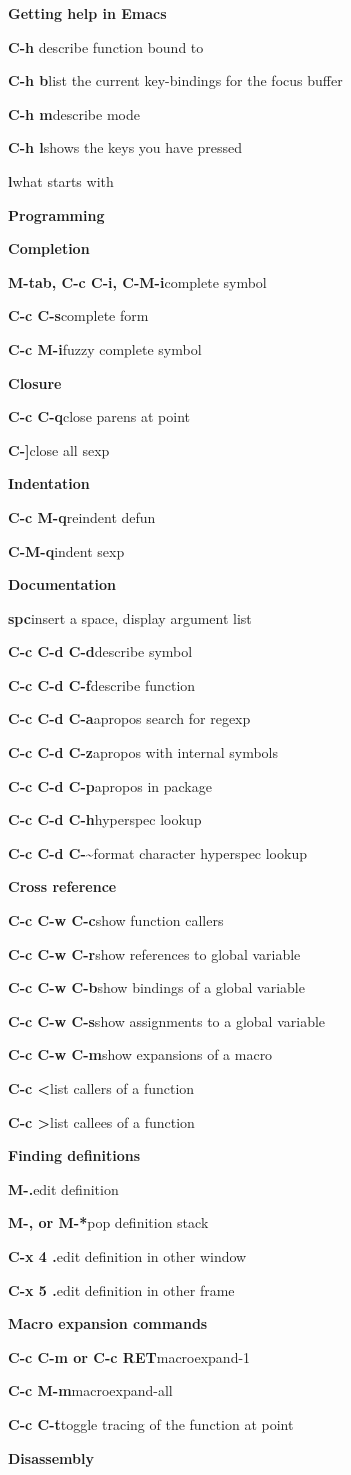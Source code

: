 \documentclass[a4paper,10pt]{article}
\newcommand{\group}[1]{\bigskip\par\noindent\textbf{\large#1}\medskip}
\newcommand{\subgroup}[1]{\medskip\par\noindent\textbf{#1}\smallskip}
\newcommand{\key}[2]{\par\noindent\textbf{#1}\hfill{#2}}
\newcommand{\meta}[1]{\textlangle{#1}\textrangle}
\begin{document}

\group{Getting help in Emacs}

\key{C-h \meta{key}}{describe function bound to \meta{key}}
\key{C-h b}{list the current key-bindings for the focus buffer}
\key{C-h m}{describe mode}
\key{C-h l}{shows the keys you have pressed}
\key{\meta{key} l}{what starts with \meta{key}}

\group{Programming}

\subgroup{Completion}

\key{M-tab, C-c C-i, C-M-i}{complete symbol}
\key{C-c C-s}{complete form}
\key{C-c M-i}{fuzzy complete symbol}

\subgroup{Closure}

\key{C-c C-q}{close parens at point}
\key{C-]}{close all sexp}

\subgroup{Indentation}

\key{C-c M-q}{reindent defun}
\key{C-M-q}{indent sexp}

\subgroup{Documentation}

\key{spc}{insert a space, display argument list}
\key{C-c C-d C-d}{describe symbol}
\key{C-c C-d C-f}{describe function}
\key{C-c C-d C-a}{apropos search for regexp}
\key{C-c C-d C-z}{apropos with internal symbols}
\key{C-c C-d C-p}{apropos in package}
\key{C-c C-d C-h}{hyperspec lookup}
\key{C-c C-d C-\~}{format character hyperspec lookup}


\subgroup{Cross reference}

\key{C-c C-w C-c}{show function callers}
\key{C-c C-w C-r}{show references to global variable}
\key{C-c C-w C-b}{show bindings of a global variable}
\key{C-c C-w C-s}{show assignments to a global variable}
\key{C-c C-w C-m}{show expansions of a macro}
\key{C-c \textless}{list callers of a function}
\key{C-c \textgreater}{list callees of a function}

\subgroup{Finding definitions}

\key{M-.}{edit definition}
\key{M-, or M-*}{pop definition stack}
\key{C-x 4 .}{edit definition in other window}
\key{C-x 5 .}{edit definition in other frame}

\newpage

\subgroup{Macro expansion commands}

\key{C-c C-m or C-c RET}{macroexpand-1}
\key{C-c M-m}{macroexpand-all}
\key{C-c C-t}{toggle tracing of the function at point}

\subgroup{Disassembly}
\end{document}
